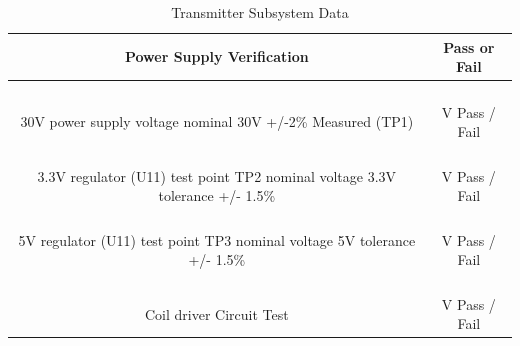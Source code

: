 \documentclass[12pt]{article}
\begin{document}
\begin{table}[h!]
\centering
\caption*{Transmitter Subsystem Data}
\begin{tabular}{ | c | c | }
\hline
\textbf{Power Supply Verification} & \textbf{Pass or Fail} \\
\hline
\parbox{0.5\linewidth}{\raggedright \hfill \\[-0.25 em]
30V power supply voltage nominal 30V +/-2\% Measured (TP1) \hfill \\[0.1 em]
} &  \parbox{0.4\linewidth}{\raggedright \hfill \\ [0.7 em]
\underline{\hspace{0.625in}} V  \hspace{0.125 in}Pass \space / \space  Fail \hfill \\ [0.3 em]
} \\
\hline
\parbox{0.5\linewidth}{\raggedright \hfill \\[-0.25 em]
3.3V regulator (U11) test point TP2 nominal voltage 3.3V  tolerance +/- 1.5\% \hfill \\[0.1 em]
} &  \parbox{0.4\linewidth}{\raggedright \hfill \\ [0.7 em]
\underline{\hspace{0.625in}} V  \hspace{0.125 in}Pass \space / \space  Fail \hfill \\ [0.3 em]
} \\
\hline
\parbox{0.5\linewidth}{\raggedright \hfill \\[-0.25 em]
5V regulator (U11) test point TP3 nominal voltage 5V  tolerance +/- 1.5\% \hfill \\[0.1 em]
} &  \parbox{0.4\linewidth}{\raggedright \hfill \\ [0.7 em]
\underline{\hspace{0.625in}} V  \hspace{0.125 in}Pass \space / \space  Fail \hfill \\ [0.3 em]
} \\ 
\hline
\parbox{0.5\linewidth}{\raggedright \hfill \\[-0.25 em]
Coil driver Circuit Test \hfill \\[0.1 em]
} &  \parbox{0.4\linewidth}{\raggedright \hfill \\ [0.7 em]
\underline{\hspace{0.625in}} V  \hspace{0.125 in}Pass \space / \space  Fail \hfill \\ [0.3 em]
} \\ 

\end{tabular}
\end{table}
\end{document}

